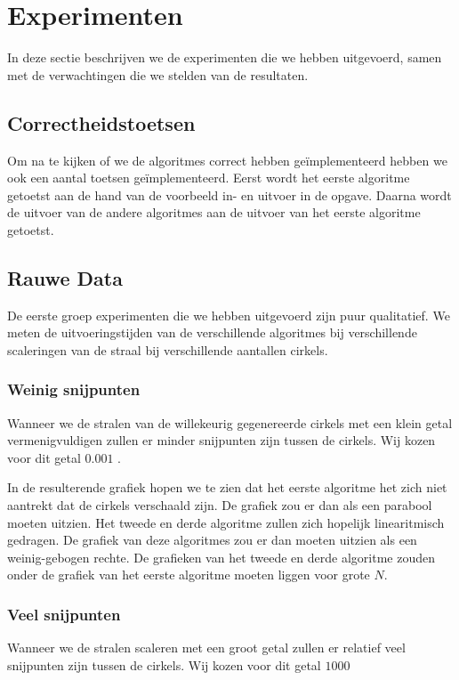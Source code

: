 \newpage
\section{Experimenten}
In deze sectie beschrijven we de experimenten die we hebben uitgevoerd, samen met de verwachtingen die we stelden van de resultaten.

\subsection{Correctheidstoetsen}
Om na te kijken of we de algoritmes correct hebben ge\"implementeerd hebben we ook een aantal toetsen ge\"implementeerd.
Eerst wordt het eerste algoritme getoetst aan de hand van de voorbeeld in- en uitvoer in de opgave.
Daarna wordt de uitvoer van de andere algoritmes aan de uitvoer van het eerste algoritme getoetst.

\subsection{Rauwe Data}
De eerste groep experimenten die we hebben uitgevoerd zijn puur qualitatief. We meten de uitvoeringstijden van de verschillende algoritmes bij verschillende scaleringen van de straal bij verschillende aantallen cirkels.

\subsubsection{Weinig snijpunten}
Wanneer we de stralen van de willekeurig gegenereerde cirkels met een klein getal vermenigvuldigen zullen er minder snijpunten zijn tussen de cirkels. Wij kozen voor dit getal $0.001$ .

In de resulterende grafiek hopen we te zien dat het eerste algoritme het zich niet aantrekt dat de cirkels verschaald zijn. De grafiek zou er dan als een parabool moeten uitzien. Het tweede en derde algoritme zullen zich hopelijk linearitmisch gedragen. De grafiek van deze algoritmes zou er dan moeten uitzien als een weinig-gebogen rechte. De grafieken van het tweede en derde algoritme zouden onder de grafiek van het eerste algoritme moeten liggen voor grote $N$.

\subsubsection{Veel snijpunten}
Wanneer we de stralen scaleren met een groot getal zullen er relatief veel snijpunten zijn tussen de cirkels. Wij kozen voor dit getal $1000$ 

